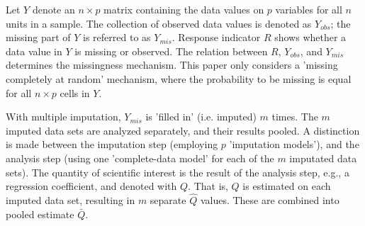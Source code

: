 \documentclass[article]{jss}
\begin{document}
Let $Y$ denote an $n \times p$ matrix containing the data values on $p$ variables for all $n$ units in a sample. The collection of observed data values is denoted as $Y_{obs}$; the missing part of $Y$ is referred to as $Y_{mis}$. Response indicator $R$ shows whether a data value in $Y$ is missing or observed. The relation between $R$, $Y_{obs}$, and $Y_{mis}$ determines the missingness mechanism. This paper only considers a 'missing completely at random' mechanism, where the probability to be missing is equal for all $n \times p$ cells in $Y$.

With multiple imputation, $Y_{mis}$ is 'filled in' (i.e. imputed) $m$ times. The $m$ imputed data sets are analyzed separately, and their results pooled. A distinction is made between the imputation step (employing $p$ 'imputation models'), and the analysis step (using one 'complete-data model' for each of the $m$ imputated data sets). The quantity of scientific interest is the result of the analysis step, e.g., a regression coefficient, and denoted with $Q$. That is, $Q$ is estimated on each imputed data set, resulting in $m$ separate $\hat{Q}$ values. These are combined into pooled estimate $\bar{Q}$.

\end{document}

